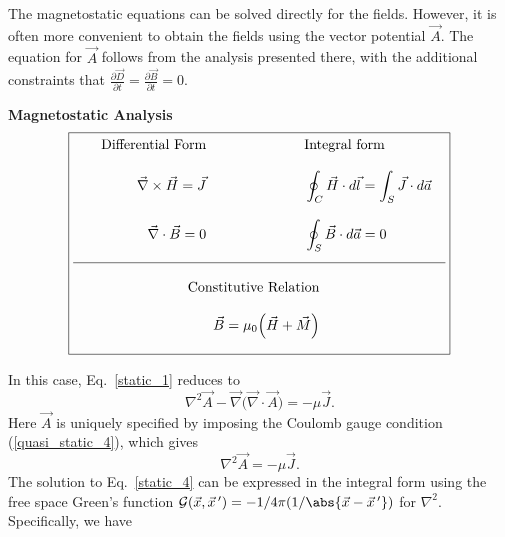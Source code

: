 \documentclass[12pt,a4paper,oneside]{book}
\begin{document}
\begin{onehalfspace}
The magnetostatic equations can be solved directly for the fields. However, it is often more convenient to obtain the fields using the vector potential $\vec{A}$. The equation for $\vec{A}$ follows from the analysis presented there, with the additional constraints that $\frac{\partial \vec{D}}{\partial t} = \frac{\partial \vec{B}}{\partial t}=0$.
\begin{table}[H]
	\centering \textbf{Magnetostatic Analysis} \\
\begin{equation*}
\boxed{\begin{aligned}
	\begin{aligned}
		&\quad &\text{Differential Form} &\qquad &\qquad \qquad& \text{Integral form} & \\[8pt] 
		&\quad &\vec{\nabla}\times\vec{H}=\vec{J} &\qquad &\qquad \qquad& \oint_C\vec{H}\cdot d\vec{l}=\int_S\vec{J}\cdot d\vec{a} &	\\[8pt]  
		&\quad &\vec{\nabla} \cdot\vec{B}=0 &\qquad &\qquad \qquad& \oint_{S}\vec{B}\cdot d\vec{a}=0 & \\[8pt]
		\hline
	\end{aligned} \\[8pt] 
	\begin{aligned}
		&\qquad  &\qquad  &\qquad &\text{Constitutive Relation}  &\quad  &\qquad \qquad& \qquad& \\[8pt] 
		&\qquad  &\qquad  &\qquad &\vec{B}=\mu_0\Big(\vec{H}+\vec{M}\Big)  &\quad  &\qquad \qquad&  \qquad& \\[8pt] 
	\end{aligned}
\end{aligned}}
\end{equation*}
	\caption{Differential and integral form of Magnetostatic equations.}
	\label{static_table}
\end{table}
In this case, Eq.~\eqref{static_1} reduces to 
\begin{equation}\label{static_3}
\nabla^2\vec{A}-\vec{\nabla}\big(\vec{\nabla}\cdot\vec{A}\big)=-\mu\vec{J}.
\end{equation} 
Here $\vec{A}$ is uniquely specified by imposing the Coulomb gauge condition (\ref{quasi_static_4}), which gives 
\begin{equation}\label{static_4}
	\nabla^2\vec{A}=-\mu\vec{J}.
\end{equation} 
The solution to Eq.~\eqref{static_4} can be expressed in the integral form using the free space Green's function $\mathcal{G}(\vec{x},\vec{x}\,')=-1/4\pi(1/\abs{\vec{x}-\vec{x}\,'})$ for $\nabla^2$. Specifically, we have

\end{onehalfspace}
\end{document}
